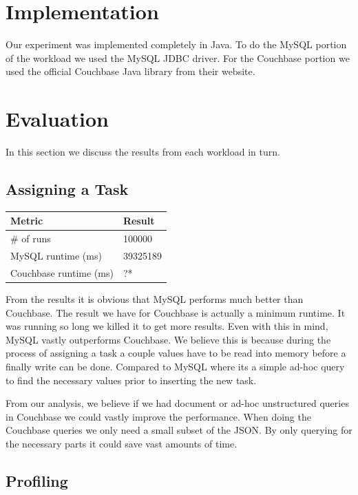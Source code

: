 \documentclass[]{IEEEtran}
\begin{document}
\section{Implementation}\label{sec:implementation}
Our experiment was implemented completely in Java. To do the MySQL portion of
the workload we used the MySQL JDBC driver. For the Couchbase portion we used
the official Couchbase Java library from their website.

\section{Evaluation}\label{sec:eval}
In this section we discuss the results from each workload in turn.

\subsection{Assigning a Task}

\begin{center}
\begin{tabular}{|l|l|}
	\hline
	{\bf Metric} & {\bf Result} \\
	\hline
        \# of runs & 100000 \\
        \hline
        MySQL runtime (ms) & 39325189 \\
	\hline
        Couchbase runtime (ms) & ?* \\
        \hline
\end{tabular}
\end{center}

From the results it is obvious that MySQL performs much better than Couchbase. The result we have for
Couchbase is actually a minimum runtime. It was running so long we killed it to get more results. Even with this
in mind, MySQL vastly outperforms Couchbase. We believe this is because during the process of assigning a task
a couple values have to be read into memory before a finally write can be done. Compared to MySQL where its a simple 
ad-hoc query to find the necessary values prior to inserting the new task. 

From our analysis, we believe if we had document or ad-hoc unstructured queries in Couchbase we could vastly improve the performance.
When doing the Couchbase queries we only need a small subset of the JSON. By only querying for the necessary parts it could save vast amounts of time.

\subsection{Profiling}
\end{document}
